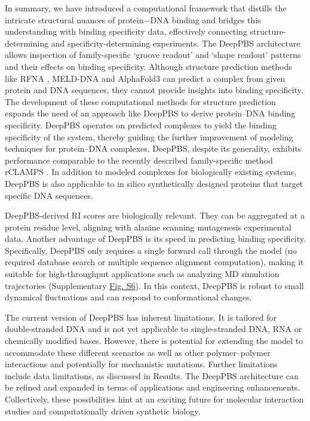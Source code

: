 \par
In summary, we have introduced a computational framework that distills the intricate structural nuances of protein$-$DNA binding and bridges this understanding with binding specificity data, effectively connecting structure-determining and specificity-determining experiments. The DeepPBS architecture allows inspection of family-specific ‘groove readout’ and ‘shape readout’ patterns and their effects on binding specificity. Although structure prediction methods like RFNA \citep{baek2024na}, MELD-DNA \citep{Esmaeeli2023} and AlphaFold3 \citep{Abramson2024} can predict a complex from given protein and DNA sequences, they cannot provide insights into binding specificity. The development of these computational methods for structure prediction expands the need of an approach like DeepPBS to derive protein–DNA binding specificity. DeepPBS operates on predicted complexes to yield the binding specificity of the system, thereby guiding the further improvement of modeling techniques for protein–DNA complexes. DeepPBS, despite its generality, exhibits performance comparable to the recently described family-specific method rCLAMPS \citep{Wetzel2022}. In addition to modeled complexes for biologically existing systems, DeepPBS is also applicable to in silico synthetically designed proteins that target specific DNA sequences.
\par
DeepPBS-derived RI scores are biologically relevant. They can be aggregated at a protein residue level, aligning with alanine scanning mutagenesis experimental data. Another advantage of DeepPBS is its speed in predicting binding specificity. Specifically, DeepPBS only requires a single forward call through the model (no required database search or multiple sequence alignment computation), making it suitable for high-throughput applications such as analyzing MD simulation trajectories (Supplementary \hyperref[fig:pdnaS6]{Fig. S6}). In this context, DeepPBS is robust to small dynamical fluctuations and can respond to conformational changes.
\par
The current version of DeepPBS has inherent limitations. It is tailored for double-stranded DNA and is not yet applicable to single-stranded DNA, RNA or chemically modified bases. However, there is potential for extending the model to accommodate these different scenarios as well as other polymer–polymer interactions and potentially for mechanistic mutations. Further limitations include data limitations, as discussed in Results. The DeepPBS architecture can be refined and expanded in terms of applications and engineering enhancements. Collectively, these possibilities hint at an exciting future for molecular interaction studies and computationally driven synthetic biology. 

